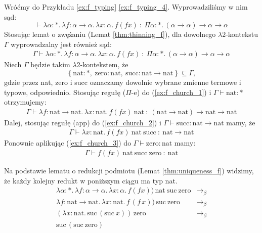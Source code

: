   \begin{przyklad}
    Wróćmy do Przykładu \ref{ex:f_typing} \ref{ex:f_typing_4}. Wyprowadziliśmy w nim sąd:
    \[\vdash\lambda \alpha : * .\, \lambda f : \alpha \to \alpha .\, \lambda x : \alpha .\, f (f x)\ :\ \Pi \alpha : * .\, (\alpha \to \alpha) \to \alpha \to \alpha\]
    Stosując lemat o zwężaniu (Lemat \ref{thm:thinning_f}), dla dowolnego \(\lambda 2\)-kontekstu \(\Gamma\) wyprowadzalny jest również sąd:
    \begin{align}
      \Gamma\vdash\lambda \alpha : * .\, \lambda f : \alpha \to \alpha .\, \lambda x : \alpha .\, f (f x)\ :\ \Pi \alpha : * .\, (\alpha \to \alpha) \to \alpha \to \alpha\tag{1}\label{ex:f_church_1}
    \end{align}
    Niech \(\Gamma\) będzie takim \(\lambda 2\)-kontekstem, że 
    \[\left\{
      \mathrm{nat}:*,\ 
      \mathrm{zero}:\mathrm{nat},\ 
      \mathrm{succ}:\mathrm{nat}\to\mathrm{nat}
    \right\} \subseteq \Gamma,
    \]
    gdzie przez nat, zero i succ oznaczamy dowolnie wybrane zmienne termowe i typowe, odpowiednio.
    Stosując regułę (\(\Pi\)-e) do (\ref{ex:f_church_1}) i \(\Gamma\vdash \mathrm{nat}:*\) otrzymujemy:
    \begin{align}
      \Gamma\vdash\lambda f : \mathrm{nat} \to \mathrm{nat}.\, \lambda x : \mathrm{nat}.\, f (f x)\ \mathrm{nat}\ :\ (\mathrm{nat} \to \mathrm{nat}) \to \mathrm{nat} \to \mathrm{nat}\tag{2}\label{ex:f_church_2}
    \end{align}
    Dalej, stosując regułę (app) do (\ref{ex:f_church_2}) i \(\Gamma\vdash \mathrm{succ}:\mathrm{nat}\to\mathrm{nat}\) mamy, że
    \begin{align}
      \Gamma \vdash \lambda x : \mathrm{nat}.\, f (f x)\ \mathrm{nat}\ \mathrm{succ}\ :\ \mathrm{nat} \to \mathrm{nat}\tag{3}\label{ex:f_church_3}
    \end{align}
    Ponownie aplikując (\ref{ex:f_church_3}) do \(\Gamma\vdash \mathrm{zero}:\mathrm{nat}\) mamy:
    \begin{align}
      \Gamma \vdash f (f x)\ \mathrm{nat}\ \mathrm{succ}\ \mathrm{zero}\ :\ \mathrm{nat} \tag{4}\label{ex:f_church_4}
    \end{align}

    Na podstawie lematu o redukcji podmiotu (Lemat \ref{thm:uniqueness_f}) widzimy, że każdy kolejny redukt w poniższym ciągu ma typ nat. 
    \begin{align*}
      \lambda \alpha : *.\,\lambda f:\alpha\to\alpha.\,\lambda x:\alpha.\,f(f x))\,\mathrm{nat\  suc\  zero} &\to_\beta\\
      \lambda f : \mathrm{nat}\to\mathrm{nat}.\,\lambda x :\mathrm{nat} .\, f\,(f\,x))\, \mathrm{suc\  zero} &\to_\beta\\
      (\lambda x:\mathrm{nat}.\,\mathrm{suc}\,(\mathrm{suc}\ x))\,\mathrm{zero} &\to_\beta \\
      \mathrm{suc}\,(\mathrm{suc}\ \mathrm{zero})&
    \end{align*}
  \end{przyklad}

